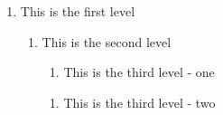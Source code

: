 \documentclass{book}
\begin{document}
\begin{enumerate}[1]
\item This is the first level
\begin{enumerate}[a]
\item This is the second level
\begin{enumerate}[i]
\item This is the third level - one
\end{enumerate}
\begin{enumerate}[i, start=2]
\item This is the third level - two
\end{enumerate}
\end{enumerate}
\end{enumerate}
\end{document}
